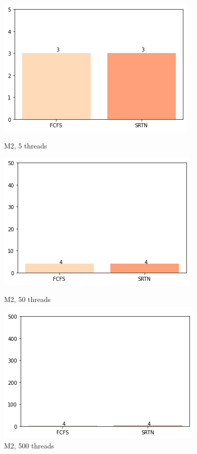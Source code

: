 \documentclass{beamer}
\begin{document}
\begin{frame}
\blindtext



\blindtext

\begin{figure}[!htb]
  \includegraphics[width=\linewidth]{imgs/deadline5-2}
  \caption{M2, 5 threads}\label{fig:awesome_image1}
\endminipage\hfill
{}
  \includegraphics[width=\linewidth]{imgs/deadline50-2}
  \caption{M2, 50 threads}\label{fig:awesome_image2}
\endminipage\hfill
{}%
  \includegraphics[width=\linewidth]{imgs/deadline500-2}
  \caption{M2, 500 threads}\label{fig:awesome_image3}
\endminipage
\end{figure}


\end{frame}
\end{document}
